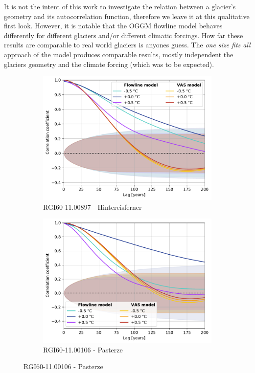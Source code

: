       It is not the intent of this work to investigate the relation between a glacier's geometry and its autocorrelation function, therefore we leave it at this qualitative first look. However, it is notable that the OGGM flowline model behaves differently for different glaciers and/or different climatic forcings. How far these results are comparable to real world glaciers is anyones guess. The \textit{one size fits all} approach of the \vas{} model produces comparable results, mostly independent the glaciers geometry and the climate forcing (which was to be expected).

      \begin{figure}[htp]
        \centering
        
        \begin{subfigure}[b]{0.48\textwidth}
          \caption{RGI60-11.00897 - Hintereisferner}
          \label{fig:acf:hintereisferner}
          \centering
          \includegraphics[width=\textwidth]{../plots/final_plots/acf/Hintereisferner.pdf}
        \end{subfigure}
        \hfill
        \begin{subfigure}[b]{0.48\textwidth}
          \caption{RGI60-11.00106 - Pasterze}
          \label{fig:acf:pasterze}
          \centering
          \includegraphics[width=\textwidth]{../plots/final_plots/acf/Pasterze.pdf}
        \end{subfigure}


\end{figure}
